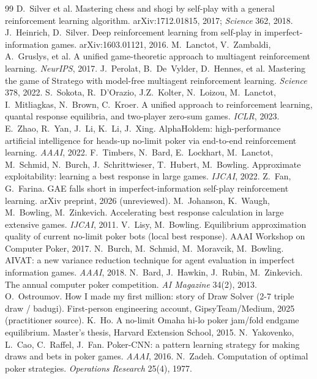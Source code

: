 \begin{thebibliography}{99}
 D.~Silver et al. Mastering chess and shogi by self-play with a general reinforcement learning algorithm. arXiv:1712.01815, 2017; \emph{Science} 362, 2018.
 J.~Heinrich, D.~Silver. Deep reinforcement learning from self-play in imperfect-information games. arXiv:1603.01121, 2016.
 M.~Lanctot, V.~Zambaldi, A.~Gruslys, et al. A unified game-theoretic approach to multiagent reinforcement learning. \emph{NeurIPS}, 2017.
 J.~Perolat, B.~De~Vylder, D.~Hennes, et al. Mastering the game of Stratego with model-free multiagent reinforcement learning. \emph{Science} 378, 2022.
 S.~Sokota, R.~D'Orazio, J.Z.~Kolter, N.~Loizou, M.~Lanctot, I.~Mitliagkas, N.~Brown, C.~Kroer. A unified approach to reinforcement learning, quantal response equilibria, and two-player zero-sum games. \emph{ICLR}, 2023.
 E.~Zhao, R.~Yan, J.~Li, K.~Li, J.~Xing. AlphaHoldem: high-performance artificial intelligence for heads-up no-limit poker via end-to-end reinforcement learning. \emph{AAAI}, 2022.
 F.~Timbers, N.~Bard, E.~Lockhart, M.~Lanctot, M.~Schmid, N.~Burch, J.~Schrittwieser, T.~Hubert, M.~Bowling. Approximate exploitability: learning a best response in large games. \emph{IJCAI}, 2022.
 Z.~Fan, G.~Farina. GAE falls short in imperfect-information self-play reinforcement learning. arXiv preprint, 2026 (unreviewed).
 M.~Johanson, K.~Waugh, M.~Bowling, M.~Zinkevich. Accelerating best response calculation in large extensive games. \emph{IJCAI}, 2011.
 V.~Lisy, M.~Bowling. Equilibrium approximation quality of current no-limit poker bots (local best response). AAAI Workshop on Computer Poker, 2017.
 N.~Burch, M.~Schmid, M.~Moravcik, M.~Bowling. AIVAT: a new variance reduction technique for agent evaluation in imperfect information games. \emph{AAAI}, 2018.
 N.~Bard, J.~Hawkin, J.~Rubin, M.~Zinkevich. The annual computer poker competition. \emph{AI Magazine} 34(2), 2013.
 O.~Ostroumov. How I made my first million: story of Draw Solver (2-7 triple draw / badugi). First-person engineering account, GipsyTeam/Medium, 2025 (practitioner source).
 K.~Ho. A no-limit Omaha hi-lo poker jam/fold endgame equilibrium. Master's thesis, Harvard Extension School, 2015.
 N.~Yakovenko, L.~Cao, C.~Raffel, J.~Fan. Poker-CNN: a pattern learning strategy for making draws and bets in poker games. \emph{AAAI}, 2016.
 N.~Zadeh. Computation of optimal poker strategies. \emph{Operations Research} 25(4), 1977.

\end{thebibliography}
